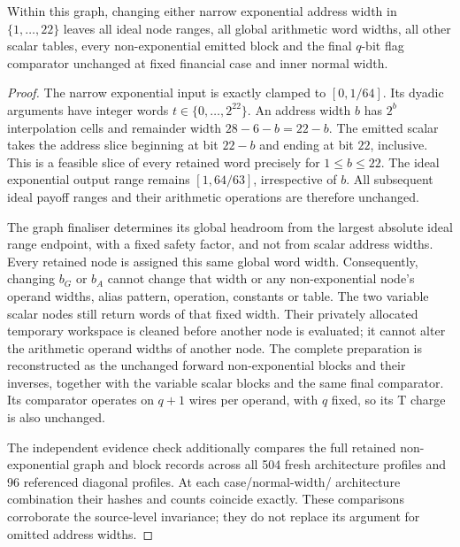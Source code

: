 \begin{lemma}
\label{lem:raw-asymmetric-fixed-width}
Within this graph, changing either narrow exponential address width in
$\{1,\ldots,22\}$ leaves all ideal node ranges, all global arithmetic
word widths, all other scalar tables, every non-exponential emitted block
and the final $q$-bit flag comparator unchanged at fixed financial case
and inner normal width.
\end{lemma}
\begin{proof}
The narrow exponential input is exactly clamped to $[0,1/64]$. Its
dyadic arguments have integer words $t\in\{0,\ldots,2^{22}\}$.
An address width $b$ has $2^b$ interpolation cells and remainder width
$28-6-b=22-b$. The emitted scalar takes the address slice beginning
at bit $22-b$ and ending at bit $22$, inclusive. This is a feasible
slice of every retained word precisely for $1\leq b\leq22$.
The ideal exponential output range remains $[1,64/63]$, irrespective
of $b$. All subsequent ideal payoff ranges and their arithmetic
operations are therefore unchanged.

The graph finaliser determines its global headroom from the largest
absolute ideal range endpoint, with a fixed safety factor, and not from
scalar address widths. Every retained node is assigned this same global
word width. Consequently, changing $b_G$ or $b_A$ cannot change that
width or any non-exponential node's operand widths, alias pattern,
operation, constants or table. The two variable scalar nodes still
return words of that fixed width. Their privately allocated temporary
workspace is cleaned before another node is evaluated; it cannot alter
the arithmetic operand widths of another node. The complete preparation
is reconstructed as the unchanged forward non-exponential blocks and
their inverses, together with the variable scalar blocks and the same
final comparator. Its comparator operates on $q+1$ wires per operand,
with $q$ fixed, so its T charge is also unchanged.

The independent evidence check additionally compares the full retained
non-exponential graph and block records across all 504 fresh architecture
profiles and 96 referenced diagonal profiles. At each case/normal-width/
architecture combination their hashes and counts coincide exactly.
These comparisons corroborate the source-level invariance; they do not
replace its argument for omitted address widths.
\end{proof}

